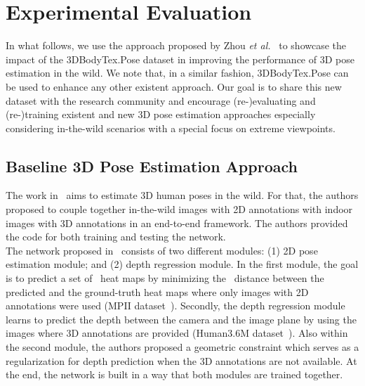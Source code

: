 \documentclass{article}
\begin{document}
\section{Experimental Evaluation}
\label{sec:experiments}
\vspace{-0.1cm}
In what follows, we use the approach proposed by Zhou \textit{et al.}~\cite{zhou2017towards} to showcase the impact of the 3DBodyTex.Pose dataset in improving the performance of 3D pose estimation in the wild. We note that, in a similar fashion, 3DBodyTex.Pose can be used to enhance any other existent approach. Our goal is to share this new dataset with the research community and encourage (re-)evaluating and (re-)training existent and new 3D pose estimation approaches especially considering in-the-wild scenarios with a special focus on extreme viewpoints.

\vspace{-0.1cm}
\subsection{Baseline 3D Pose Estimation Approach}
\vspace{-0.1cm}
The work in~\cite{zhou2017towards} aims to estimate 3D human poses in the wild. For that, the authors proposed to couple together in-the-wild images with 2D annotations with indoor images with 3D annotations in an end-to-end framework. The authors provided the code for both training and testing the network. \\
The network proposed in~\cite{zhou2017towards} consists of two different modules: (1) 2D pose estimation module; and (2) depth regression module. In the first module, the goal is to predict a set of~ heat maps by minimizing the~ distance between the predicted and the ground-truth heat maps where only images with 2D annotations were used (MPII dataset~\cite{andriluka20142d}). Secondly, the depth regression module learns to predict the depth between the camera and the image plane by using the images where 3D annotations are provided (Human3.6M dataset~\cite{h36m_pami}). Also within the second module, the authors proposed a geometric constraint which serves as a regularization for depth prediction when the 3D annotations are not available. At the end, the network is built in a way that both modules are trained together. 





\vspace{-0.1cm}
\end{document}
